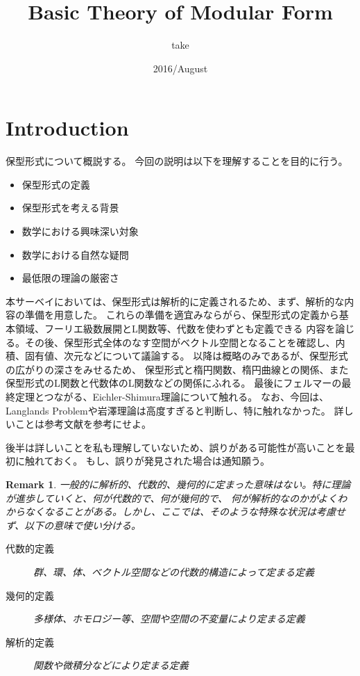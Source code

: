 \documentclass{ujarticle}
\title{Basic Theory of Modular Form}
\author{take}
\date{2016/August}
\newtheorem*{rem}{Remark}
\begin{document}
\maketitle
\tableofcontents


\section{Introduction}
\label{sec:Introduction}

保型形式について概説する。
今回の説明は以下を理解することを目的に行う。
\begin{itemize}
  \setlength{\parskip}{0cm} %
  \setlength{\itemsep}{0cm} %


  \item 保型形式の定義
  \item 保型形式を考える背景
  \item 数学における興味深い対象
  \item 数学における自然な疑問
  \item 最低限の理論の厳密さ
\end{itemize}

本サーベイにおいては、保型形式は解析的に定義されるため、まず、解析的な内容の準備を用意した。
これらの準備を適宜みならがら、保型形式の定義から基本領域、フーリエ級数展開とL関数等、代数を使わずとも定義できる
内容を論じる。その後、保型形式全体のなす空間がベクトル空間となることを確認し、内積、固有値、次元などについて議論する。
以降は概略のみであるが、保型形式の広がりの深さをみせるため、
保型形式と楕円関数、楕円曲線との関係、また保型形式のL関数と代数体のL関数などの関係にふれる。
最後にフェルマーの最終定理とつながる、Eichler-Shimura理論について触れる。
なお、今回は、Langlands Problemや岩澤理論は高度すぎると判断し、特に触れなかった。
詳しいことは参考文献を参考にせよ。

後半は詳しいことを私も理解していないため、誤りがある可能性が高いことを最初に触れておく。
もし、誤りが発見された場合は通知願う。



\begin{rem}
  一般的に解析的、代数的、幾何的に定まった意味はない。特に理論が進歩していくと、何が代数的で、何が幾何的で、
  何が解析的なのかがよくわからなくなることがある。しかし、ここでは、そのような特殊な状況は考慮せず、以下の意味で使い分ける。
　\begin{description}
    \item[代数的定義] 群、環、体、ベクトル空間などの代数的構造によって定まる定義
    \item[幾何的定義] 多様体、ホモロジー等、空間や空間の不変量により定まる定義
    \item[解析的定義] 関数や微積分などにより定まる定義
　\end{description}
\end{rem}
\end{document}
